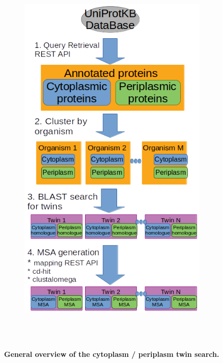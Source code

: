 ~\begin{figure}[h!]
	~\begin{subfigure}[b]{\linewidth}
		\centering
		\includegraphics[width=\linewidth, height=0.6\textheight, keepaspectratio]
		{./methods/pipeline_twin_search/img/generalFigure.png}
	~\end{subfigure}
	\caption{
		\textbf{General overview of the cytoplasm / periplasm twin search.}
	}
	\label{fig:twin_overview}
~\end{figure}

